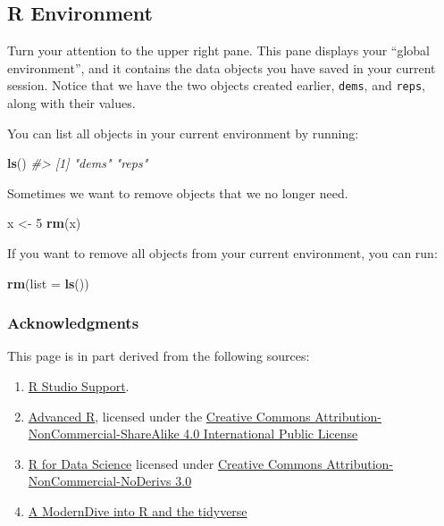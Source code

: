 \documentclass[]{book}
\newenvironment{Shaded}{\begin{snugshade}}{\end{snugshade}}
\newcommand{\CommentTok}[1]{\textcolor[rgb]{0.56,0.35,0.01}{\textit{#1}}}
\newcommand{\DataTypeTok}[1]{\textcolor[rgb]{0.13,0.29,0.53}{#1}}
\newcommand{\DecValTok}[1]{\textcolor[rgb]{0.00,0.00,0.81}{#1}}
\newcommand{\KeywordTok}[1]{\textcolor[rgb]{0.13,0.29,0.53}{\textbf{#1}}}
\newcommand{\NormalTok}[1]{#1}
\newcommand{\StringTok}[1]{\textcolor[rgb]{0.31,0.60,0.02}{#1}}
\begin{document}
\hypertarget{r-environment}{%
\subsection{R Environment}\label{r-environment}}

Turn your attention to the upper right pane. This pane displays your ``global environment'', and it contains the data objects you have saved in your current session. Notice that we have the two objects created earlier, \texttt{dems}, and \texttt{reps}, along with their values.

You can list all objects in your current environment by running:

\begin{Shaded}
\begin{Highlighting}[]
\KeywordTok{ls}\NormalTok{()}
\CommentTok{#> [1] "dems" "reps"}
\end{Highlighting}
\end{Shaded}

Sometimes we want to remove objects that we no longer need.

\begin{Shaded}
\begin{Highlighting}[]
\NormalTok{x <-}\StringTok{ }\DecValTok{5}
\KeywordTok{rm}\NormalTok{(x)}
\end{Highlighting}
\end{Shaded}

If you want to remove all objects from your current environment, you can run:

\begin{Shaded}
\begin{Highlighting}[]
\KeywordTok{rm}\NormalTok{(}\DataTypeTok{list =} \KeywordTok{ls}\NormalTok{())}
\end{Highlighting}
\end{Shaded}

\hypertarget{acknowledgments}{%
\subsubsection*{Acknowledgments}\label{acknowledgments}}

This page is in part derived from the following sources:

\begin{enumerate}
\def\labelenumi{\arabic{enumi}.}
\item
  \href{https://support.rstudio.com/hc/en-us/articles/200484448}{R Studio Support}.
\item
  \href{https://adv-r.hadley.nz/}{Advanced R}, licensed under the \href{https://creativecommons.org/licenses/by-nc-sa/4.0/}{Creative Commons Attribution-NonCommercial-ShareAlike 4.0 International Public License}
\item
  \href{https://r4ds.had.co.nz}{R for Data Science} licensed under \href{https://creativecommons.org/licenses/by-nc-nd/3.0/us/}{Creative Commons Attribution-NonCommercial-NoDerivs 3.0}
\item
  \href{https://moderndive.netlify.com/1-getting-started.html}{A ModernDive into R and the tidyverse}
\end{enumerate}
\end{document}
